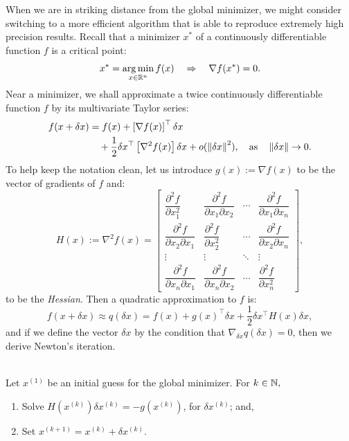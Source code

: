 When we are in striking distance from the global minimizer, we might consider switching to a more efficient algorithm that is able to reproduce extremely high precision results. Recall that a minimizer $x^*$ of a continuously differentiable function $f$ is a critical point:
\[
x^* = \argmin_{x\in\R^n} f(x) \quad \Rightarrow \quad \nabla f(x^*) = 0.
\]
Near a minimizer, we shall approximate a twice continuously differentiable function $f$ by its multivariate Taylor series:
\begin{align*}
f(x+\delta x) & = f(x) + \left[\nabla f(x)\right]^\top \delta x\\
& \quad + \dfrac{1}{2}\delta x^\top \left[\nabla^2 f(x)\right] \delta x + o(\left\|{\delta x}\right\|^2),\quad {\rm as}\quad \left\|{\delta x}\right\|\to0.
\end{align*}
To help keep the notation clean, let us introduce $g(x) := \nabla f(x)$ to be the vector of gradients of $f$ and:
\[
H(x) := \nabla^2 f(x) = \begin{bmatrix} \dfrac{\partial^2 f}{\partial x_1^2} & \dfrac{\partial^2 f}{\partial x_1\partial x_2} & \cdots & \dfrac{\partial^2 f}{\partial x_1\partial x_n}\\
\dfrac{\partial^2 f}{\partial x_2\partial x_1} & \dfrac{\partial^2 f}{\partial x_2^2} & \cdots & \dfrac{\partial^2 f}{\partial x_2\partial x_n}\\
\vdots & \vdots & \ddots & \vdots\\
\dfrac{\partial^2 f}{\partial x_n\partial x_1} & \dfrac{\partial^2 f}{\partial x_n\partial x_2} & \cdots & \dfrac{\partial^2 f}{\partial x_n^2}\end{bmatrix},
\]
to be the {\em Hessian}. Then a quadratic approximation to $f$ is:
\[
f(x+\delta x) \approx q(\delta x) = f(x) + g(x)^\top \delta x + \dfrac{1}{2}\delta x^\top H(x) \delta x,
\]
and if we define the vector $\delta x$ by the condition that $\nabla_{\delta x} q(\delta x) = 0$, then we derive Newton's iteration.

\begin{algorithm}~\\
Let $x^{(1)}$ be an initial guess for the global minimizer. For $k\in\mathbb{N},$
\begin{enumerate}
\item Solve $H(x^{(k)})\delta x^{(k)} = -g(x^{(k)})$, for $\delta x^{(k)}$; and,
\item Set $x^{(k+1)} = x^{(k)} + \delta x^{(k)}$.
\end{enumerate}
\end{algorithm}

